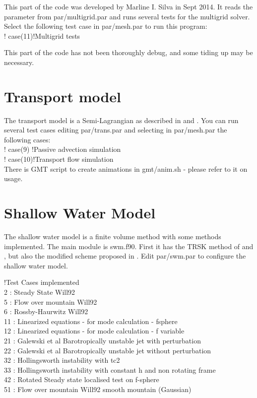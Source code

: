 \documentclass[a4paper,10pt]{article}
\begin{document}
This part of the code was developed by Marline I. Silva in Sept 2014. It reads the parameter from par/multigrid.par and runs several tests for the multigrid solver. Select the following test case in par/mesh.par to run this program:\\
!  case(11)!Multigrid tests

This part of the code has not been thoroughly debug, and some tiding up may be necessary.


\section{Transport model}

The transport model is a Semi-Lagrangian as described in \cite{Peixoto2013b} and \cite{Peixoto2014}. You can run several test cases editing par/trans.par and selecting in par/mesh.par the following cases:\\
!  case(9) !Passive advection simulation\\
!  case(10)!Transport flow simulation\\

There is GMT script to create animations in gmt/anim.sh - please refer to it on usage.

\section{Shallow Water Model}

The shallow water model is a finite volume method with some methods implemented. The main module is swm.f90. First it has the TRSK method of \cite{Thuburn2009} and \cite{Ringler2010}, but also the modified scheme proposed in \cite{Peixoto2015}. Edit par/swm.par to configure the shallow water model. 

!Test Cases implemented\\
2 : Steady State Will92\\
5 : Flow over mountain Will92\\
6 : Rossby-Haurwitz Will92 \\
11 : Linearized equations - for mode calculation - fsphere\\
12 : Linearized equations - for mode calculation - f variable\\
21 : Galewski et al Barotropically unstable jet with perturbation\\
22 : Galewski et al Barotropically unstable jet without perturbation\\
32 : Hollingsworth instability with tc2\\
33 : Hollingsworth instability with constant h and non rotating frame  \\
42 : Rotated Steady state localised test on f-sphere\\
51 : Flow over mountain Will92 smooth mountain (Gaussian)\\
\end{document}
